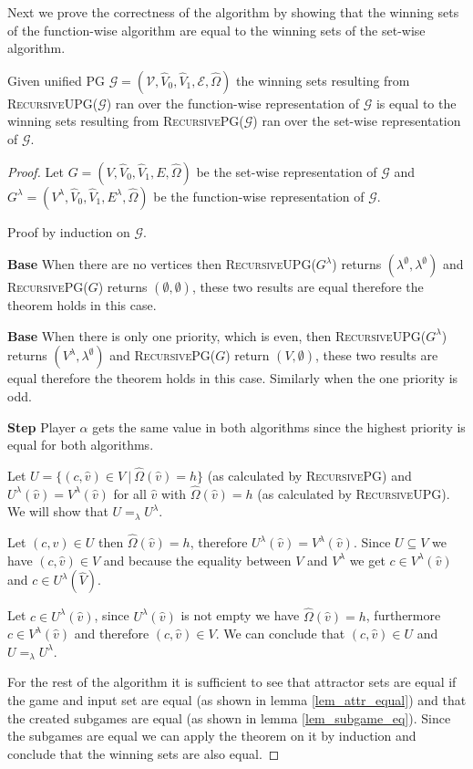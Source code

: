 Next we prove the correctness of the algorithm by showing that the winning sets of the function-wise algorithm are equal to the winning sets of the set-wise algorithm.
\begin{theorem}
	Given unified PG $\mathcal{G} = (\mathcal{V},\hat{V}_0,\hat{V}_1, \mathcal{E}, \hat{\Omega})$ the winning sets resulting from \textsc{RecursiveUPG($\mathcal{G}$)} ran over the function-wise representation of $\mathcal{G}$ is equal to the winning sets resulting from \textsc{RecursivePG($\mathcal{G}$)} ran over the set-wise representation of $\mathcal{G}$.
	\begin{proof}
		Let $G = (V,\hat{V}_0,\hat{V}_1,E,\hat{\Omega})$ be the set-wise representation of $\mathcal{G}$ and $G^\lambda = (V^\lambda, \hat{V}_0, \hat{V}_1, E^\lambda, \hat{\Omega})$ be the function-wise representation of $\mathcal{G}$.
		
		Proof by induction on $\mathcal{G}$.
		
		\textbf{Base} When there are no vertices then \textsc{RecursiveUPG($G^\lambda$)} returns $(\lambda^\emptyset,\lambda^\emptyset)$ and \textsc{RecursivePG($G$)} returns $(\emptyset,\emptyset)$, these two results are equal therefore the theorem holds in this case.
		
		\textbf{Base} When there is only one priority, which is even, then \textsc{RecursiveUPG($G^\lambda$)} returns $(V^\lambda,\lambda^\emptyset)$ and \textsc{RecursivePG($G$)} return $(V,\emptyset)$, these two results are equal therefore the theorem holds in this case. Similarly when the one priority is odd.
		
		\textbf{Step}
		Player $\alpha$ gets the same value in both algorithms since the highest priority is equal for both algorithms.
		
		Let $U = \{(c,\hat{v}) \in V\ |\ \hat{\Omega}(\hat{v}) = h \}$ (as calculated by \textsc{RecursivePG}) and $U^\lambda(\hat{v}) = V^\lambda(\hat{v})$ for all $\hat{v}$ with $\hat{\Omega}(\hat{v}) = h$ (as calculated by \textsc{RecursiveUPG}). We will show that $U =_\lambda U^\lambda$.
		
		Let $(c,\hat{v}) \in U$ then $\hat{\Omega}(\hat{v}) = h$, therefore $U^\lambda(\hat{v}) = V^\lambda(\hat{v})$. Since $U \subseteq V$ we have $(c,\hat{v}) \in V$ and because the equality between $V$ and $V^\lambda$ we get $c \in V^\lambda(\hat{v})$ and $c \in U^\lambda(\hat{V})$.
		
		Let $c \in U^\lambda(\hat{v})$, since $U^\lambda(\hat{v})$ is not empty we have $\hat{\Omega}(\hat{v}) = h$, furthermore $c \in V^\lambda(\hat{v})$ and therefore $(c,\hat{v}) \in V$. We can conclude that $(c, \hat{v}) \in U$ and $U =_\lambda U^\lambda$.
		
		For the rest of the algorithm it is sufficient to see that attractor sets are equal if the game and input set are equal (as shown in lemma \ref{lem_attr_equal}) and that the created subgames are equal (as shown in lemma \ref{lem_subgame_eq}). Since the subgames are equal we can apply the theorem on it by induction and conclude that the winning sets are also equal.
	\end{proof}
\end{theorem}

